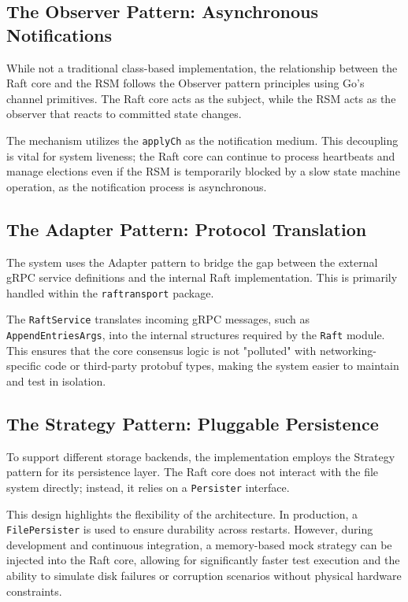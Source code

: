 \subsection{The Observer Pattern: Asynchronous Notifications}
While not a traditional class-based implementation, the relationship between the Raft core and the RSM follows the Observer pattern principles using Go's channel primitives. The Raft core acts as the subject, while the RSM acts as the observer that reacts to committed state changes.

The mechanism utilizes the \texttt{applyCh} as the notification medium. This decoupling is vital for system liveness; the Raft core can continue to process heartbeats and manage elections even if the RSM is temporarily blocked by a slow state machine operation, as the notification process is asynchronous.

\subsection{The Adapter Pattern: Protocol Translation}
The system uses the Adapter pattern to bridge the gap between the external gRPC service definitions and the internal Raft implementation. This is primarily handled within the \texttt{raftransport} package.

The \texttt{RaftService} translates incoming gRPC messages, such as \texttt{AppendEntriesArgs}, into the internal structures required by the \texttt{Raft} module. This ensures that the core consensus logic is not "polluted" with networking-specific code or third-party protobuf types, making the system easier to maintain and test in isolation.

\subsection{The Strategy Pattern: Pluggable Persistence}
To support different storage backends, the implementation employs the Strategy pattern for its persistence layer.
The Raft core does not interact with the file system directly; instead, it relies on a \texttt{Persister} interface.

This design highlights the flexibility of the architecture. In production, a \texttt{FilePersister} is used to ensure durability across restarts. However, during development and continuous integration, a memory-based mock strategy can be injected into the Raft core, allowing for significantly faster test execution and the ability to simulate disk failures or corruption scenarios without physical hardware constraints.

